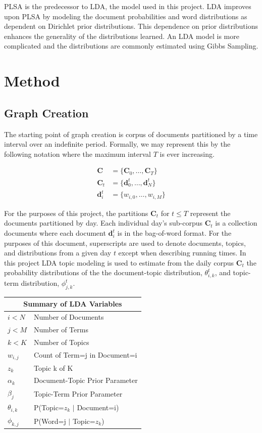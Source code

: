 \documentclass[10pt,twocolumn]{article}
\begin{document}
PLSA is the predecessor to LDA, the model used in this project.  LDA improves upon PLSA by modeling the document probabilities and word distributions as dependent on Dirichlet prior distributions.  This dependence on prior distributions enhances the generality of the distributions learned.  An LDA model is more complicated and the distributions are commonly estimated using Gibbs Sampling.

\section {Method}
\subsection {Graph Creation}
The starting point of graph creation is corpus of documents partitioned by a time interval over an indefinite period.   Formally, we may represent this by the following notation where the maximum interval $T$ is ever increasing.  

\begin{align*}
\mathbf{C} &= \{ \mathbf{C}_0, \dots, \mathbf{C}_T \} \\
\mathbf{C}_t &= \{\mathbf{d}_0^t, \dots, \mathbf{d}_N^t \} \\
\mathbf{d}_i^t &= \{ w_{i,0}, \dots, w_{i,M} \}
\end{align*}

For the purposes of this project, the partitions $\mathbf{C}_t$ for $t \le T$ represent the documents partitioned by day.  Each individual day's sub-corpus $\mathbf{C}_t$ is a collection documents where each document $\mathbf{d}_i^t$ is in the bag-of-word format.  For the purposes of this document, superscripts are used to denote documents, topics, and distributions from a given day $t$ except when describing running times.  In this project LDA topic modeling is used to estimate from the daily corpus $\mathbf{C}_t$ the probability distributions of the the document-topic distribution, $\theta_{i,k}^t$, and topic-term distribution, $\phi_{j,k}^t$.

\begin{table}
\begin{center}
\begin{tabular}{|l|l|}
  \hline
  \multicolumn{2}{|c|}{Summary of LDA Variables} \\
  \hline
  $i < N$ & Number of Documents \\
  $j < M$ & Number of Terms \\
  $k < K$ & Number of Topics \\
  $w_{i, j}$ & Count of Term=j in Document=i \\
  $z_k$ & Topic k of K \\
  \emph{$\alpha_k$} & Document-Topic Prior Parameter\\
  \emph{$\beta_j$} & Topic-Term Prior Parameter \\
  $\theta_{i,k}$ & P(Topic=$z_k$ $\vert$ Document=i) \\
  $\phi_{k,j}$ & P(Word=j $\vert$ Topic=$z_k$) \\
  \hline
\end{tabular}
\end{center}
\end{table}
\end{document}
